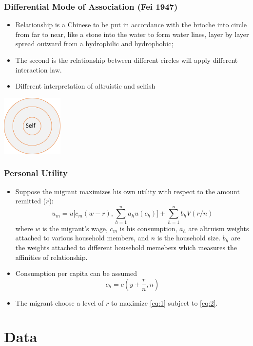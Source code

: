 \documentclass[10pt]{beamer}
\begin{document}
\begin{frame}[c]\frametitle{Differential Mode of Association (Fei 1947)}

\begin{itemize}
\item Relationship is a Chinese to be put in accordance with the brioche into circle from far to near, like a stone into the water to form water lines, layer by layer spread outward from a hydrophilic and hydrophobic;
\item The second is the relationship between different circles will apply different interaction law.
\item Different interpretation of altruistic and selfish
\end{itemize}
\hskip 2cm
\includegraphics[width=0.23\textwidth]{order.png}

\end{frame}

\begin{frame}[c]\frametitle{Personal Utility}
\begin{itemize}
    \item Suppose the migrant maximizes his own utility with respect to the amount remitted ($r$):
\begin{equation}\label{eq:1}
    u_{m} = u\big[c_{m}(w-r),\sum_{h=1}^{n}a_{h}u(c_{h})\big] + \sum_{h=1}^{n}b_{h}V(r/n)
\end{equation}
where $w$ is the migrant\rq{}s wage, $c_{m}$ is his  consumption, $a_{h}$ are altruism weights attached to various household members, and $n$ is the household size. $b_{h}$ are the weights attached to different household memebers which measures the affinities of relationship.
\item Consumption per capita can be assumed
\begin{equation}\label{eq:2}
    c_{h} = c(y+\frac{r}{n},n)
\end{equation}
\item The migrant choose a level of $r$ to maximize \eqref{eq:1} subject to \eqref{eq:2}.
\end{itemize}
\end{frame}

\section{Data}
\end{document}
